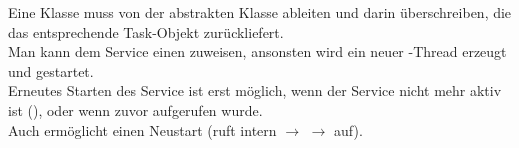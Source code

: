 \noindent
Eine Klasse muss von der abstrakten Klasse  ableiten und darin  überschreiben, die das entsprechende Task-Objekt zurückliefert.\\

\noindent
Man kann dem Service einen  zuweisen, ansonsten wird ein neuer -Thread erzeugt und gestartet.\\

\noindent
Erneutes Starten des Service ist erst möglich, wenn der Service nicht mehr aktiv ist (), oder wenn zuvor  aufgerufen wurde.\\
Auch  ermöglicht einen Neustart (ruft intern  $\rightarrow$  $\rightarrow$  auf).